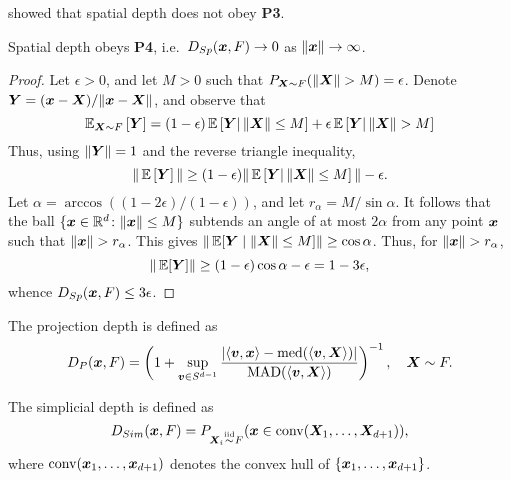 \begin{remark}
    \textcite{nagy-2017} showed that spatial depth does not obey \textbf{P3}.
\end{remark}

\begin{lemma}\label{lem:spatial_vanish}
    Spatial depth obeys \textbf{P4}, i.e.\ $D_{Sp}(\bm{x}, F) \to 0$ as
    $\Vert \bm{x} \Vert \to \infty$.
\end{lemma}
\begin{proof}
    Let $\epsilon > 0$, and let $M > 0$ such that $P_{\bm{X} \sim F}(\Vert \bm{X} \Vert >
    M) = \epsilon$.
    Denote $\bm{Y} = (\bm{x} - \bm{X}) / \Vert \bm{x} - \bm{X} \Vert$, and observe that
    \begin{equation}
        \operatorname{\mathbb{E}}_{\bm{X} \sim F}\left[\bm{Y}\right]
        = (1 - \epsilon)\operatorname{\mathbb{E}}\left[\bm{Y}|\, \Vert \bm{X} \Vert \leq M\right] +
          \epsilon\operatorname{\mathbb{E}}\left[\bm{Y}|\, \Vert \bm{X} \Vert > M\right]
    \end{equation}
    Thus, using $\Vert \bm{Y} \Vert = 1$ and the reverse triangle inequality,
    \begin{equation}
        \Vert \operatorname{\mathbb{E}}\left[\bm{Y}\right] \Vert
        \geq (1 - \epsilon)\Vert \operatorname{\mathbb{E}}\left[\bm{Y}|\, \Vert \bm{X} \Vert \leq M\right] \Vert - \epsilon.
    \end{equation}
    Let $\alpha = \arccos((1 - 2\epsilon)/(1 - \epsilon))$, and let $r_\alpha =
    M/\sin\alpha$.
    It follows that the ball $\{\bm{x} \in \mathbb{R}^d\colon \Vert \bm{x} \Vert \leq M\}$
    subtends an angle of at most $2\alpha$ from any point $\bm{x}$ such that
    $\Vert \bm{x} \Vert > r_\alpha$.
    This gives $\Vert \operatorname{\mathbb{E}}[\bm{Y} \mid \Vert \bm{X} \Vert \leq M] \Vert \geq \cos\alpha$.
    Thus, for $\Vert \bm{x} \Vert > r_\alpha$,
    \begin{equation}
        \Vert \operatorname{\mathbb{E}}[\bm{Y}] \Vert \geq (1 - \epsilon)\cos\alpha - \epsilon = 1 - 3\epsilon,
    \end{equation}
    whence $D_{Sp}(\bm{x}, F) \leq 3\epsilon$.
\end{proof}



\begin{definition}
    The projection depth is defined as
    \begin{equation}
        D_P(\bm{x}, F) = \left(1 + \sup_{\bm{v} \in S^{d - 1}} \frac{|\langle \bm{v}, \bm{x} \rangle - \operatorname{med}(\langle \bm{v}, \bm{X} \rangle)|}{\operatorname{MAD}(\langle \bm{v}, \bm{X} \rangle)}\right)^{-1}, \quad
        \bm{X} \sim F.
    \end{equation}
\end{definition}

\begin{definition}
    The simplicial depth is defined as
    \begin{equation}
        D_{Sim}(\bm{x}, F) = P_{\bm{X}_i \overset{\text{iid}}{\sim} F}(\bm{x} \in \operatorname{conv}(\bm{X}_1, \dots, \bm{X}_{d + 1})),
    \end{equation}
    where $\operatorname{conv}(\bm{x}_1, \dots, \bm{x}_{d + 1})$ denotes the convex hull of $\{\bm{x}_1, \dots, \bm{x}_{d + 1}\}$.
\end{definition}


